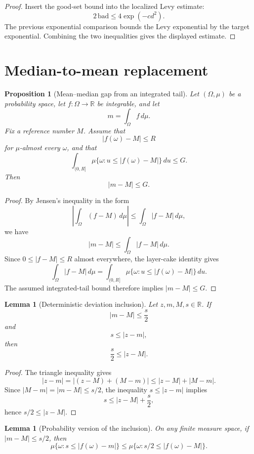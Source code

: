 \documentclass[11pt]{article}
\newtheorem{lemma}[theorem]{Lemma}
\newtheorem{proposition}[theorem]{Proposition}
\newcommand{\R}{\mathbb{R}}
\begin{document}
\begin{proof}
Insert the good-set bound into the localized Levy estimate:
\[
 2\,\mathrm{bad}\le 4\exp(-c d^2).
\]
The previous exponential comparison bounds the Levy exponential by the target
exponential.  Combining the two inequalities gives the displayed estimate.
\end{proof}

\section{Median-to-mean replacement}

\begin{proposition}[Mean--median gap from an integrated tail]
Let \((\Omega,\mu)\) be a probability space, let \(f:\Omega\to\R\) be
integrable, and let
\[
  m=\int_\Omega f\,d\mu.
\]
Fix a reference number \(M\).  Assume that
\[
  |f(\omega)-M|\le R
\]
for \(\mu\)-almost every \(\omega\), and that
\[
 \int_{(0,R]}
   \mu\{\omega:u\le |f(\omega)-M|\}\,du
 \le G.
\]
Then
\[
  |m-M|\le G.
\]
\end{proposition}

\begin{proof}
By Jensen's inequality in the form
\[
 \left|\int_\Omega (f-M)\,d\mu\right|
 \le
 \int_\Omega |f-M|\,d\mu,
\]
we have
\[
  |m-M|\le \int_\Omega |f-M|\,d\mu.
\]
Since \(0\le |f-M|\le R\) almost everywhere, the layer-cake identity gives
\[
 \int_\Omega |f-M|\,d\mu
 =
 \int_{(0,R]}
   \mu\{\omega:u\le |f(\omega)-M|\}\,du.
\]
The assumed integrated-tail bound therefore implies \(|m-M|\le G\).
\end{proof}

\begin{lemma}[Deterministic deviation inclusion]
Let \(z,m,M,s\in\R\).  If
\[
 |m-M|\le \frac{s}{2}
\]
and
\[
 s\le |z-m|,
\]
then
\[
 \frac{s}{2}\le |z-M|.
\]
\end{lemma}

\begin{proof}
The triangle inequality gives
\[
 |z-m|
 =
 |(z-M)+(M-m)|
 \le
 |z-M|+|M-m|.
\]
Since \(|M-m|=|m-M|\le s/2\), the inequality \(s\le |z-m|\) implies
\[
 s\le |z-M|+\frac{s}{2},
\]
hence \(s/2\le |z-M|\).
\end{proof}

\begin{lemma}[Probability version of the inclusion]
On any finite measure space, if \(|m-M|\le s/2\), then
\[
 \mu\{\omega:s\le |f(\omega)-m|\}
 \le
 \mu\{\omega:s/2\le |f(\omega)-M|\}.
\]
\end{lemma}
\end{document}

